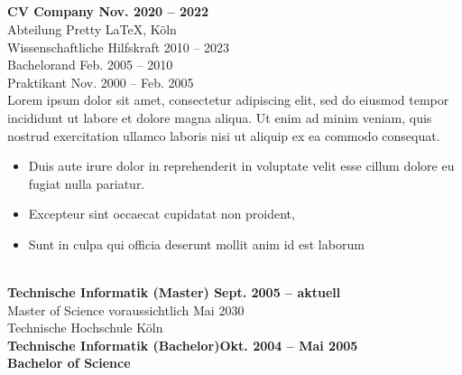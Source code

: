 \begin{smashminipageright}
	\\ %
	\color{medium-gray}
	\normalsize \MakeUppercase{\so{\cv}} \\
	\\
	

	\\
	\textbf{CV Company \null\hfill Nov. 2020 – \december{}  2022} \\
	Abteilung Pretty \LaTeX, Köln \\
	Wissenschaftliche Hilfskraft \null\hfill \may{} 2010 – \december{} 2023 \\
	Bachelorand \null\hfill Feb. 2005 – \may{} 2010 \\ 
	Praktikant \null\hfill Nov. 2000 – Feb. 2005 \\
	\smallbreak
	Lorem ipsum dolor sit amet, consectetur adipiscing elit, 
	sed do eiusmod tempor incididunt ut labore et dolore magna aliqua. 
	Ut enim ad minim veniam, 
	quis nostrud exercitation ullamco laboris nisi ut aliquip ex ea commodo consequat.
	\begin{itemize}
		\itemsep0em %
  		\item Duis aute irure dolor in reprehenderit in voluptate velit esse cillum dolore eu fugiat nulla pariatur. 
    	\item Excepteur sint occaecat cupidatat non proident, 
		\item Sunt in culpa qui officia deserunt mollit anim id est laborum
	\end{itemize}
	\bigbreak
	\bigbreak
	\\
	\textbf{Technische Informatik (Master) \null\hfill Sept. 2005 – aktuell }\\
	Master of Science voraussichtlich Mai 2030\\
	Technische Hochschule Köln \\
	\smallbreak
	\textbf{Technische Informatik (Bachelor)\null\hfill Okt. 2004 – Mai 2005 }\\
	\textbf{Bachelor of Science} \\

\end{smashminipageright}
